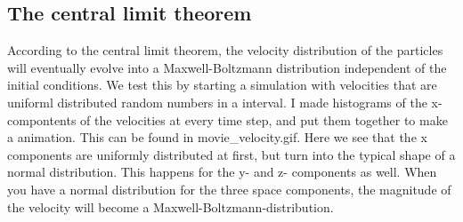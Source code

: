 \subsection{The central limit theorem}
According to the central limit theorem, the velocity distribution of the particles will eventually evolve into a Maxwell-Boltzmann distribution independent of the initial conditions. We test this by starting a simulation with velocities that are uniforml distributed
random numbers in a interval. I made histograms of the x-compontents of the velocities at every time step, and put them together to make a animation. This can be found in movie\_velocity.gif. Here we see that the x components are uniformly distributed at first, but turn into the typical shape of a normal distribution. This happens for 
the y- and z- components as well. When you have a normal distribution for the three space components, the magnitude of the velocity will become a Maxwell-Boltzmann-distribution.  
